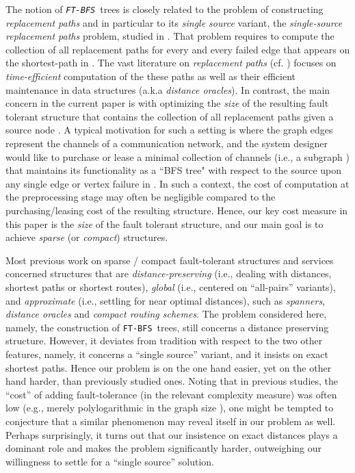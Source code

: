 \documentclass[12pt]{article}
\def\FTBFS{\mbox{\tt FT-BFS}}
\begin{document}
The notion of {\em \FTBFS}\ trees is closely related to the problem of
constructing \emph{replacement paths} and in particular to its
{\em single source} variant,
the \emph{single-source replacement paths} problem,
studied in \cite{GW12}. That problem requires to compute the collection
 of all  replacement paths  for every 
and every failed edge  that appears on the  shortest-path in .
The vast literature on \emph{replacement paths} (cf. \cite{BK09,GW12,RTREP05,TZ05,WY10}) focuses on \emph{time-efficient} computation of the these paths as well as their efficient maintenance in data structures (a.k.a {\em distance oracles}).
In contrast, the main concern in the current paper is with optimizing
the \emph{size} of the resulting fault tolerant structure that contains the
collection  of all replacement paths given a source node .
A typical motivation for such a setting is where the graph edges represent
the channels of a communication network, and the system designer would like
to purchase or lease a minimal collection of channels
(i.e., a subgraph ) that maintains its functionality
as a ``BFS tree" with respect to the source  upon any single
edge or vertex failure in .
In such a context, the cost of computation at the preprocessing stage may
often be negligible compared to the purchasing/leasing cost of the resulting
structure. Hence, our key cost measure in this paper is the \emph{size} of
the fault tolerant structure, and our main goal is to achieve {\em sparse}
(or {\em compact}) structures.

Most previous work on sparse / compact fault-tolerant structures and services
concerned structures that are {\em distance-preserving}
(i.e., dealing with distances, shortest paths or shortest routes),
{\em global} (i.e., centered on ``all-pairs'' variants),
and {\em approximate} (i.e., settling for near optimal distances),
such as {\em spanners}, {\em distance oracles} and
{\em compact routing schemes}.
The problem considered here, namely, the construction of \FTBFS\ trees,
still concerns a distance preserving structure.
However, it deviates from tradition with respect to the two other features,
namely, it concerns a ``single source'' variant,
and it insists on exact shortest paths.
Hence our problem is on the one hand easier, yet on the other hand harder,
than previously studied ones.
Noting that in previous studies, the ``cost'' of adding fault-tolerance
(in the relevant complexity measure) was often low (e.g., merely polylogarithmic
in the graph size ),
one might be tempted to conjecture that a similar phenomenon may reveal itself
in our problem as well.
Perhaps surprisingly, it turns out that our insistence on exact distances
plays a dominant role and makes the problem significantly harder,
outweighing our willingness to settle for a ``single source'' solution.
\end{document}
